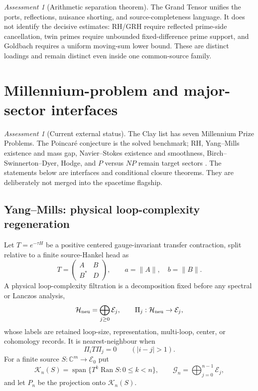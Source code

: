 \documentclass[11pt]{article}
\theoremstyle{definition}
\theoremstyle{remark}
\newtheorem{assessment}[theorem]{Assessment}
\newcommand{\C}{\mathbb C}
\newcommand{\norm}[1]{\lVert#1\rVert}
\newcommand{\Span}{\operatorname{span}}
\newcommand{\Ran}{\operatorname{Ran}}
\begin{document}
\begin{assessment}[Arithmetic separation theorem]
The Grand Tensor unifies the ports, reflections, nuisance shorting, and
source-completeness language.  It does not identify the decisive estimates:
RH/GRH require reflected prime-side cancellation, twin primes require
unbounded fixed-difference prime support, and Goldbach requires a uniform
moving-sum lower bound.  These are distinct loadings and remain distinct even
inside one common-source family.
\end{assessment}

\section{Millennium-problem and major-sector interfaces}
\label{sec:millennium-interface}

\begin{assessment}[Current external status]
The Clay list has seven Millennium Prize Problems.  The Poincar\'e conjecture
is the solved benchmark; RH, Yang--Mills existence and mass gap,
Navier--Stokes existence and smoothness, Birch--Swinnerton--Dyer, Hodge, and
$P$ versus $NP$ remain target sectors \cite{ClayMillennium}.  The statements below are interfaces
and conditional closure theorems.  They are deliberately not merged into the
spacetime flagship.
\end{assessment}

\subsection{Yang--Mills: physical loop-complexity regeneration}

Let $T=e^{-\tau H}$ be a positive centered gauge-invariant transfer
contraction, split relative to a finite source-Hankel head as
\[
 T=\begin{pmatrix}A&B\\B^*&D\end{pmatrix},
 \qquad a=\norm A,\quad b=\norm B.
\]
A physical loop-complexity filtration is a decomposition fixed before any
spectral or Lanczos analysis,
\[
 \mathcal H_{\rm neu}=\bigoplus_{j\ge0}\mathcal E_j,
 \qquad \Pi_j:\mathcal H_{\rm neu}\to\mathcal E_j,
\]
whose labels are retained loop-size, representation, multi-loop, center, or
cohomology records.  It is nearest-neighbour when
\[
 \Pi_iT\Pi_j=0\qquad(|i-j|>1).
\]
For a finite source $S:\C^m\to\mathcal E_0$ put
\[
 \mathcal K_n(S)=\Span\{T^k\Ran S:0\le k<n\},
 \qquad
 \mathcal G_n=\bigoplus_{j=0}^{n-1}\mathcal E_j,
\]
and let $P_n$ be the projection onto $\mathcal K_n(S)$.
\end{document}
